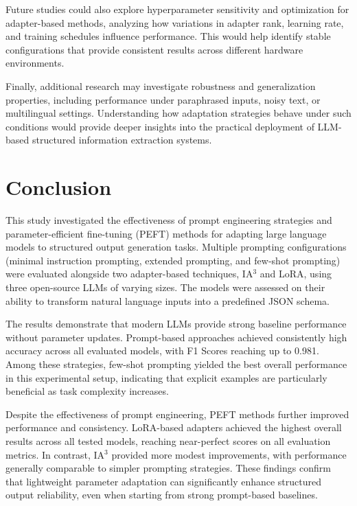 \documentclass[journal,article,submit,pdftex,moreauthors]{Definitions/mdpi}
\begin{document}
Future studies could also explore hyperparameter sensitivity and optimization for adapter-based methods, analyzing how variations in adapter rank, learning rate, and training schedules influence performance. This would help identify stable configurations that provide consistent results across different hardware environments.

Finally, additional research may investigate robustness and generalization properties, including performance under paraphrased inputs, noisy text, or multilingual settings. Understanding how adaptation strategies behave under such conditions would provide deeper insights into the practical deployment of LLM-based structured information extraction systems.

\section{Conclusion}

This study investigated the effectiveness of prompt engineering strategies and parameter-efficient fine-tuning (PEFT) methods for adapting large language models to structured output generation tasks. Multiple prompting configurations (minimal instruction prompting, extended prompting, and few-shot prompting) were evaluated alongside two adapter-based techniques, IA$^3$ and LoRA, using three open-source LLMs of varying sizes. The models were assessed on their ability to transform natural language inputs into a predefined JSON schema.

The results demonstrate that modern LLMs provide strong baseline performance without parameter updates. Prompt-based approaches achieved consistently high accuracy across all evaluated models, with F1 Scores reaching up to 0.981. Among these strategies, few-shot prompting yielded the best overall performance in this experimental setup, indicating that explicit examples are particularly beneficial as task complexity increases.

Despite the effectiveness of prompt engineering, PEFT methods further improved performance and consistency. LoRA-based adapters achieved the highest overall results across all tested models, reaching near-perfect scores on all evaluation metrics. In contrast, IA$^3$ provided more modest improvements, with performance generally comparable to simpler prompting strategies. These findings confirm that lightweight parameter adaptation can significantly enhance structured output reliability, even when starting from strong prompt-based baselines.
\end{document}
